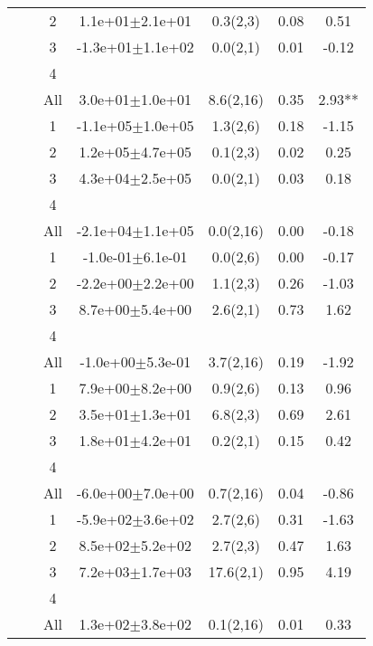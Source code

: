 \begin{longtable}{llccccS[table-format=-2.2, table-space-text-post = {***}]}
   &  & 2 &  1.1e+01$\pm$2.1e+01 & 0.3(2,3) & 0.08 & 0.51 \\ 
   &  & 3 & -1.3e+01$\pm$1.1e+02 & 0.0(2,1) & 0.01 & -0.12 \\ 
   &  & 4 &  &  &  &  \\ 
   &  & All &  3.0e+01$\pm$1.0e+01 & 8.6(2,16) & 0.35 & 2.93** \\ 
   \midrule
{} & {} & 1 & -1.1e+05$\pm$1.0e+05 & 1.3(2,6) & 0.18 & -1.15 \\ 
   &  & 2 &  1.2e+05$\pm$4.7e+05 & 0.1(2,3) & 0.02 & 0.25 \\ 
   &  & 3 &  4.3e+04$\pm$2.5e+05 & 0.0(2,1) & 0.03 & 0.18 \\ 
   &  & 4 &  &  &  &  \\ 
   &  & All & -2.1e+04$\pm$1.1e+05 & 0.0(2,16) & 0.00 & -0.18 \\ 
   \midrule
{} & {} & 1 & -1.0e-01$\pm$6.1e-01 & 0.0(2,6) & 0.00 & -0.17 \\ 
   &  & 2 & -2.2e+00$\pm$2.2e+00 & 1.1(2,3) & 0.26 & -1.03 \\ 
   &  & 3 &  8.7e+00$\pm$5.4e+00 & 2.6(2,1) & 0.73 & 1.62 \\ 
   &  & 4 &  &  &  &  \\ 
   &  & All & -1.0e+00$\pm$5.3e-01 & 3.7(2,16) & 0.19 & -1.92 \\ 
   \midrule
{} & {} & 1 &  7.9e+00$\pm$8.2e+00 & 0.9(2,6) & 0.13 & 0.96 \\ 
   &  & 2 &  3.5e+01$\pm$1.3e+01 & 6.8(2,3) & 0.69 & 2.61 \\ 
   &  & 3 &  1.8e+01$\pm$4.2e+01 & 0.2(2,1) & 0.15 & 0.42 \\ 
   &  & 4 &  &  &  &  \\ 
   &  & All & -6.0e+00$\pm$7.0e+00 & 0.7(2,16) & 0.04 & -0.86 \\ 
   \midrule
{} & {} & 1 & -5.9e+02$\pm$3.6e+02 & 2.7(2,6) & 0.31 & -1.63 \\ 
   &  & 2 &  8.5e+02$\pm$5.2e+02 & 2.7(2,3) & 0.47 & 1.63 \\ 
   &  & 3 &  7.2e+03$\pm$1.7e+03 & 17.6(2,1) & 0.95 & 4.19 \\ 
   &  & 4 &  &  &  &  \\ 
   &  & All &  1.3e+02$\pm$3.8e+02 & 0.1(2,16) & 0.01 & 0.33 \\ 
   \midrule

\end{longtable}
